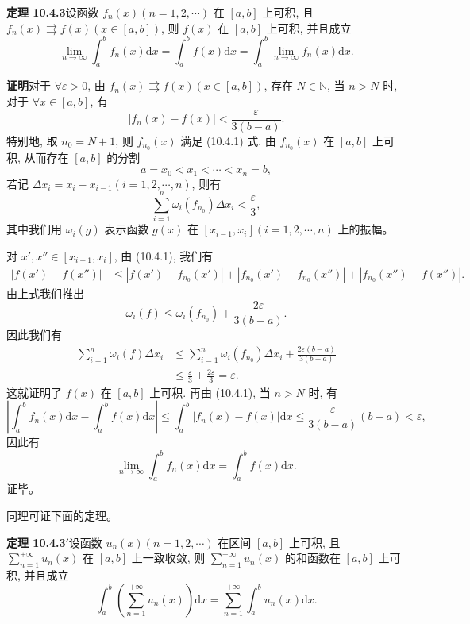 \documentclass[UTF8,12pt,a4paper,fontset=fandol]{ctexart}
\begin{document}
\noindent\textbf{定理 10.4.3}\quad 设函数 $f_n(x)(n=1,2,\cdots)$ 在 $[a,b]$ 上可积, 且 $f_n(x)\rightrightarrows f(x)(x\in[a,b])$, 则 $f(x)$ 在 $[a,b]$ 上可积, 并且成立
\[
  \lim_{n\to\infty}\int_a^b f_n(x)\mathrm dx
  =\int_a^b f(x)\mathrm dx
  =\int_a^b\lim_{n\to\infty}f_n(x)\mathrm dx.
\]

\noindent\textbf{证明}\quad 对于 $\forall\varepsilon>0$, 由 $f_n(x)\rightrightarrows f(x)(x\in[a,b])$, 存在 $N\in\mathbb N$, 当 $n>N$ 时, 对于 $\forall x\in[a,b]$, 有
\begin{equation}
  |f_n(x)-f(x)|<\frac{\varepsilon}{3(b-a)}.
  \tag{10.4.1}
\end{equation}
特别地, 取 $n_0=N+1$, 则 $f_{n_0}(x)$ 满足 (10.4.1) 式. 由 $f_{n_0}(x)$ 在 $[a,b]$ 上可积, 从而存在 $[a,b]$ 的分割
\[
  a=x_0<x_1<\cdots<x_n=b,
\]
若记 $\Delta x_i=x_i-x_{i-1}(i=1,2,\cdots,n)$, 则有
\[
  \sum_{i=1}^n \omega_i(f_{n_0})\Delta x_i<\frac\varepsilon3,
\]
其中我们用 $\omega_i(g)$ 表示函数 $g(x)$ 在 $[x_{i-1},x_i](i=1,2,\cdots,n)$ 上的振幅。

对 $x',x''\in[x_{i-1},x_i]$, 由 (10.4.1), 我们有
\[
\begin{aligned}
  |f(x')-f(x'')|
  &\leq |f(x')-f_{n_0}(x')|+|f_{n_0}(x')-f_{n_0}(x'')|+|f_{n_0}(x'')-f(x'')|.
\end{aligned}
\]
由上式我们推出
\[
  \omega_i(f)\leq\omega_i(f_{n_0})+\frac{2\varepsilon}{3(b-a)}.
\]
因此我们有
\[
\begin{aligned}
  \sum_{i=1}^n \omega_i(f)\Delta x_i
  &\leq \sum_{i=1}^n \omega_i(f_{n_0})\Delta x_i+\frac{2\varepsilon(b-a)}{3(b-a)}\\
  &\leq \frac\varepsilon3+\frac{2\varepsilon}{3}=\varepsilon.
\end{aligned}
\]
这就证明了 $f(x)$ 在 $[a,b]$ 上可积. 再由 (10.4.1), 当 $n>N$ 时, 有
\[
  \left|\int_a^b f_n(x)\mathrm dx-\int_a^b f(x)\mathrm dx\right|
  \leq \int_a^b |f_n(x)-f(x)|\mathrm dx
  \leq \frac{\varepsilon}{3(b-a)}(b-a)<\varepsilon,
\]
因此有
\[
  \lim_{n\to\infty}\int_a^b f_n(x)\mathrm dx=\int_a^b f(x)\mathrm dx.
\]
证毕。

同理可证下面的定理。

\noindent\textbf{定理 10.4.3$'$}\quad 设函数 $u_n(x)(n=1,2,\cdots)$ 在区间 $[a,b]$ 上可积, 且 $\sum\limits_{n=1}^{+\infty}u_n(x)$ 在 $[a,b]$ 上一致收敛, 则 $\sum\limits_{n=1}^{+\infty}u_n(x)$ 的和函数在 $[a,b]$ 上可积, 并且成立
\begin{equation}
  \int_a^b\left(\sum_{n=1}^{+\infty}u_n(x)\right)\mathrm dx
  =\sum_{n=1}^{+\infty}\int_a^b u_n(x)\mathrm dx.
  \tag{10.4.2}
\end{equation}
\end{document}
